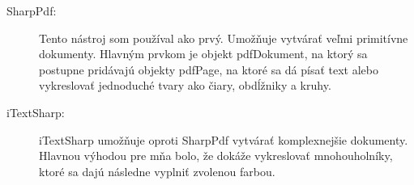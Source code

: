 \begin{description}
\item[SharpPdf:] Tento nástroj som používal ako prvý. Umožňuje vytvárať veľmi primitívne dokumenty. 
Hlavným prvkom je objekt pdfDokument, na ktorý sa postupne pridávajú objekty pdfPage, na ktoré sa dá písať text alebo vykreslovať jednoduché tvary ako čiary, obdĺžniky a kruhy.

\item[iTextSharp:]{ iTextSharp umožňuje oproti SharpPdf vytvárať komplexnejšie dokumenty. Hlavnou výhodou pre mňa bolo, že dokáže vykreslovať mnohouholníky, ktoré sa dajú následne vyplniť zvolenou farbou.

}
\end{description}



  
  
